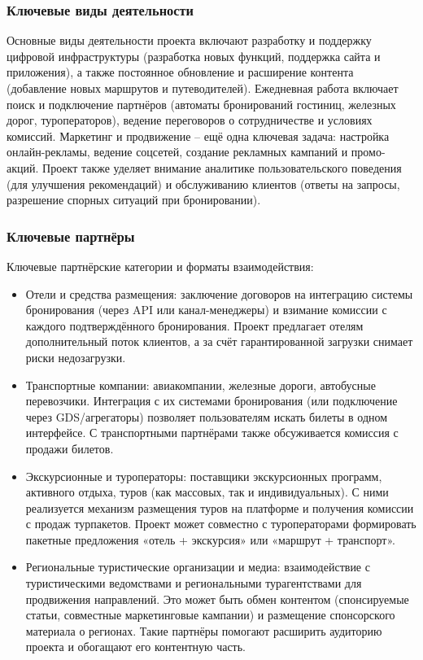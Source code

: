 \subsubsection*{Ключевые виды деятельности}
Основные виды деятельности проекта включают разработку и поддержку цифровой инфраструктуры (разработка новых функций, поддержка сайта и приложения), а также постоянное обновление и расширение контента (добавление новых маршрутов и путеводителей). Ежедневная работа включает поиск и подключение партнёров (автоматы бронирований гостиниц, железных дорог, туроператоров), ведение переговоров о сотрудничестве и условиях комиссий. Маркетинг и продвижение – ещё одна ключевая задача: настройка онлайн-рекламы, ведение соцсетей, создание рекламных кампаний и промо-акций. Проект также уделяет внимание аналитике пользовательского поведения (для улучшения рекомендаций) и обслуживанию клиентов (ответы на запросы, разрешение спорных ситуаций при бронировании).

\subsubsection*{Ключевые партнёры}
Ключевые партнёрские категории и форматы взаимодействия:
\begin{itemize}
    \item Отели и средства размещения: заключение договоров на интеграцию системы бронирования (через API или канал-менеджеры) и взимание комиссии с каждого подтверждённого бронирования. Проект предлагает отелям дополнительный поток клиентов, а за счёт гарантированной загрузки снимает риски недозагрузки.
    \item Транспортные компании: авиакомпании, железные дороги, автобусные перевозчики. Интеграция с их системами бронирования (или подключение через GDS/агрегаторы) позволяет пользователям искать билеты в одном интерфейсе. С транспортными партнёрами также обсуживается комиссия с продажи билетов.
    \item Экскурсионные и туроператоры: поставщики экскурсионных программ, активного отдыха, туров (как массовых, так и индивидуальных). С ними реализуется механизм размещения туров на платформе и получения комиссии с продаж турпакетов. Проект может совместно с туроператорами формировать пакетные предложения «отель + экскурсия» или «маршрут + транспорт».
    \item Региональные туристические организации и медиа: взаимодействие с туристическими ведомствами и региональными турагентствами для продвижения направлений. Это может быть обмен контентом (спонсируемые статьи, совместные маркетинговые кампании) и размещение спонсорского материала о регионах. Такие партнёры помогают расширить аудиторию проекта и обогащают его контентную часть.
\end{itemize}

